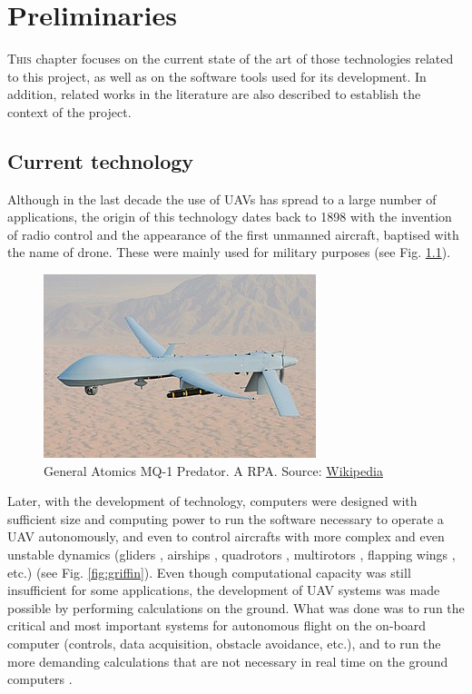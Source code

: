 \chapter{Preliminaries}
\label{ch:Preliminaries}
\lettrine[lraise=-0.1, lines=2, loversize=0.2]{T}{his} chapter focuses on the current state of the art of those technologies related to this project, as well as on the software tools used for its development. In addition, related works in the literature are also described to establish the context of the project.

\section{Current technology}
\label{sec:CurrentTechnology}
Although in the last decade the use of \glspl{UAV} has spread to a large number of applications, the origin of this technology dates back to 1898 with the invention of radio control and the appearance of the first unmanned aircraft, baptised with the name of drone. These were mainly used for military purposes (see Fig. \ref{fig:predator}).

\begin{figure}[htbp]
    \centering
    \includegraphics[width=0.6\linewidth]
    {Preliminaries/figures/Predator.jpg}
    \caption{General Atomics MQ-1 Predator. A \gls{RPA}. Source: \href{https://en.wikipedia.org/wiki/General_Atomics_MQ-1_Predator}{Wikipedia}}
    \label{fig:predator}
\end{figure}

Later, with the development of technology, computers were designed with sufficient size and computing power to run the software necessary to operate a \gls{UAV} autonomously, and even to control aircrafts with more complex and even unstable dynamics (gliders \cite{predator, BIGBLUE}, airships \cite{AURORA}, quadrotors \cite{quadrotorsreview, mesicopter, pounds, miniquadrotor}, multirotors \cite{fullyactuated}, flapping wings \cite{COLIBRI, GRIFFING, GRIFFIN2021}, etc.) (see Fig. \ref{fig:griffin}). Even though computational capacity was still insufficient for some applications, the development of \gls{UAV} systems was made possible by performing calculations on the ground. What was done was to run the critical and most important systems for autonomous flight on the on-board computer (controls, data acquisition, obstacle avoidance, etc.), and to run the more demanding calculations that are not necessary in real time on the ground computers \cite{OffBoard}.

